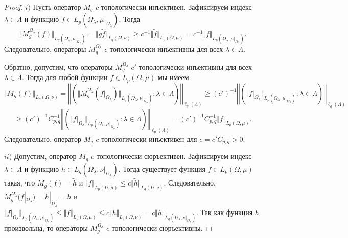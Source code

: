 \begin{proof}
$i)$ Пусть оператор $M_g$ $c$-топологически инъективен. Зафиксируем индекс $\lambda\in\Lambda$ и функцию $f\in L_p(\Omega_\lambda,\mu|_{\Omega_\lambda})$. Тогда 
$$
\Vert M_g^{\Omega_\lambda}(f)\Vert_{L_q(\Omega_\lambda,\nu|_{\Omega_\lambda})}
=\Vert g \widetilde{f}\Vert_{L_q(\Omega,\nu)}
\geq c^{-1}\Vert\widetilde{f}\Vert_{L_p(\Omega,\mu)}
=c^{-1}\Vert f\Vert_{L_p(\Omega_\lambda,\mu|_{\Omega_\lambda})}.
$$
Следовательно, операторы $M_g^{\Omega_\lambda}$ $c$-топологически инъективны для всех $\lambda\in\Lambda$. 

Обратно, допустим, что операторы $M_g^{\Omega_\lambda}$ $c'$-топологически инъективны для всех $\lambda\in\Lambda$. Тогда для любой функции $f\in L_p(\Omega,\mu)$ мы имеем
$$
\Vert M_g(f)\Vert_{L_q(\Omega,\nu)}
=\left\Vert\left(\Vert M_g^{\Omega_\lambda}(f|_{\Omega_\lambda})\Vert_{L_q(\Omega_\lambda,\nu|_{\Omega_\lambda})}:\lambda\in\Lambda\right)\right\Vert_{\ell_q(\Lambda)}
\geq (c')^{-1}\left\Vert\left(\Vert f|_{\Omega_\lambda}\Vert_{L_p(\Omega_\lambda,\mu|_{\Omega_\lambda})}:\lambda\in\Lambda\right)\right\Vert_{\ell_q(\Lambda)}
$$
$$
\geq (c')^{-1} C_{p,q}^{-1}\left\Vert\left(\Vert f|_{\Omega_\lambda}\Vert_{L_p(\Omega_\lambda,\mu|_{\Omega_\lambda})}:\lambda\in\Lambda\right)\right\Vert_{\ell_p(\Lambda)}
=(c')^{-1}C_{p,q}^{-1}\Vert f\Vert_{L_p(\Omega,\mu)}.
$$
Следовательно, оператор $M_g$ $c$-топологически инъективен для $c=c'C_{p,q}>0$.

$ii)$ Допустим, оператор $M_g$ $c$-топологически сюръективен. Зафиксируем индекс $\lambda\in\Lambda$ и функцию $h\in L_q(\Omega_\lambda,\nu|_{\Omega_\lambda})$. Тогда существует функция $f\in L_p(\Omega,\mu)$ такая, что $M_g(f)=\widetilde{h}$ и $\Vert f\Vert_{L_p(\Omega,\mu)}\leq c\Vert \widetilde{h}\Vert_{L_q(\Omega,\nu)}$. Следовательно, $M_g^{\Omega_\lambda}(f|_{\Omega_\lambda})=\widetilde{h}|_{\Omega_\lambda}=h$ и $\Vert f|_{\Omega_\lambda}\Vert_{L_p(\Omega_\lambda,\mu|_{\Omega_\lambda})}\leq \Vert f\Vert_{L_p(\Omega,\mu)}\leq c\Vert\widetilde{h}\Vert_{L_q(\Omega,\nu)}=c\Vert h\Vert_{L_q(\Omega_\lambda,\nu|_{\Omega_\lambda})}$. Так как функция $h$ произвольна, то операторы $M_g^{\Omega_\lambda}$ $c$-топологически сюръективны.


\end{proof}
